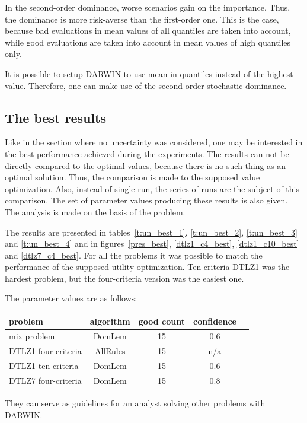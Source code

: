 In the second-order dominance, worse scenarios gain on the importance. Thus,
the dominance is more risk-averse than the first-order one. This is the case,
because bad evaluations in mean values of all quantiles are taken into
account, while good evaluations are taken into account in mean values of high
quantiles only.

It is possible to setup DARWIN to use mean in quantiles instead of the highest
value. Therefore, one can make use of the second-order stochastic dominance.





\clearpage{}
\subsection{The best results}

Like in the section where no uncertainty was considered, one may be interested
in the best performance achieved during the experiments. The results can not
be directly compared to the optimal values, because there is no such thing as
an optimal solution. Thus, the comparison is made to the supposed value
optimization. Also, instead of single run, the series of runs are the subject
of this comparison. The set of parameter values producing these results is
also given. The analysis is made on the basis of the problem.

The results are presented in tables~\ref{t:un_best_1}, \ref{t:un_best_2},
\ref{t:un_best_3} and \ref{t:un_best_4} and in figures~\ref{pres_best},
\ref{dtlz1_c4_best}, \ref{dtlz1_c10_best} and \ref{dtlz7_c4_best}. For all the
problems it was possible to match the performance of the supposed utility
optimization. Ten-criteria DTLZ1 was the hardest problem, but the
four-criteria version was the easiest one.

The parameter values are as follows:
\begin{center}
\begin{tabular}{l c c c c}
  \hline
  problem & algorithm & good count & confidence \\
  \hline
  mix problem & DomLem & 15 & 0.6 \\
  DTLZ1 four-criteria & AllRules & 15 & n/a \\
  DTLZ1 ten-criteria & DomLem & 15 & 0.6 \\
  DTLZ7 four-criteria & DomLem & 15 & 0.8 \\
  \hline
\end{tabular}
\end{center}
They can serve as guidelines for an analyst solving other problems with
DARWIN.

